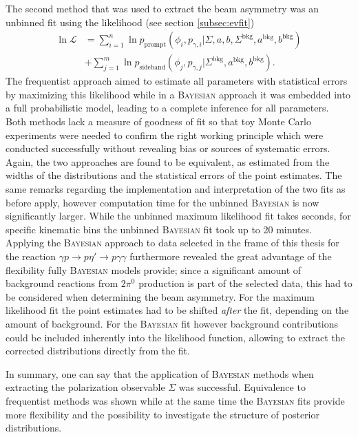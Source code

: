 The second method that was used to extract the beam asymmetry was an unbinned fit using the likelihood (see section \ref{subsec:evfit})
\begin{equation}
	\begin{aligned}
		\ln\mathcal{L}&=\sum_{i=1}^{n}\ln p_\text{prompt}\left(\phi_i,p_{\gamma,i}\big|\Sigma,a,b,\Sigma^\text{bkg},a^\text{bkg},b^\text{bkg}\right)\\&+\sum_{j=1}^m \ln p_\text{sideband}\left(\phi_j,p_{\gamma,j}\big|\Sigma^\text{bkg},a^\text{bkg},b^\text{bkg}\right).
	\end{aligned}
\end{equation}
The frequentist approach aimed to estimate all parameters with statistical errors by maximizing this likelihood while in a \textsc{Bayesian} approach it was embedded into a full probabilistic model, leading to a complete inference for all parameters. Both methods lack a measure of goodness of fit so that toy Monte Carlo experiments were needed to confirm the right working principle which were conducted successfully without revealing bias or sources of systematic errors. Again, the two approaches are found to be equivalent, as estimated from the widths of the distributions and the statistical errors of the point estimates. The same remarks regarding the implementation and interpretation of the two fits as before apply, however computation time for the unbinned \textsc{Bayesian} is now significantly larger. While the unbinned maximum likelihood fit takes seconds, for specific kinematic bins the unbinned \textsc{Bayesian} fit took up to 20 minutes. Applying the \textsc{Bayesian} approach to data selected in the frame of this thesis for the reaction $\gamma p\to p\eta'\to p\gamma\gamma$ furthermore revealed the great advantage of the flexibility fully \textsc{Bayesian} models provide; since a significant amount of background reactions from $2\pi^0$ production is part of the selected data, this had to be considered when determining the beam asymmetry. For the maximum likelihood fit the point estimates had to be shifted \emph{after} the fit, depending on the amount of background. For the \textsc{Bayesian} fit however background contributions could be included inherently into the likelihood function, allowing to extract the corrected distributions directly from the fit.

In summary, one can say that the application of \textsc{Bayesian} methods when extracting the polarization observable $\Sigma$ was successful. Equivalence to frequentist methods was shown while at the same time the \textsc{Bayesian} fits provide more flexibility and the possibility to investigate the structure of posterior distributions. 
